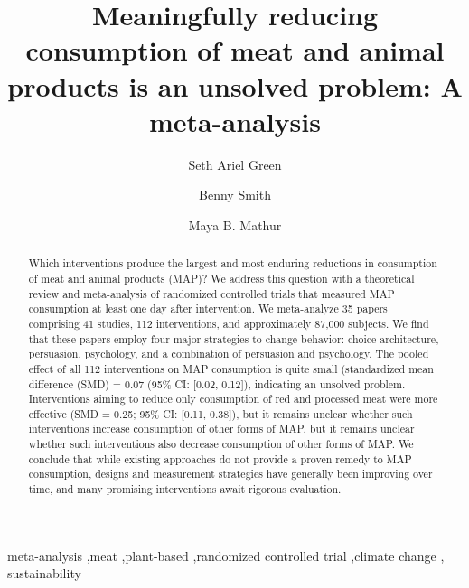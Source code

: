 \documentclass[preprint, 3p,
authoryear]{elsarticle} %
\begin{document}
\begin{frontmatter}

  \title{Meaningfully reducing consumption of meat and animal products
is an unsolved problem: A meta-analysis}
    \author[1]{Seth Ariel Green%
  }
    \author[2]{Benny Smith%
  }
    \author[1]{Maya B. Mathur%
  }
  
  \begin{abstract}
  Which interventions produce the largest and most enduring reductions
  in consumption of meat and animal products (MAP)? We address this
  question with a theoretical review and meta-analysis of randomized
  controlled trials that measured MAP consumption at least one day after
  intervention. We meta-analyze 35 papers comprising 41 studies, 112
  interventions, and approximately 87,000 subjects. We find that these
  papers employ four major strategies to change behavior: choice
  architecture, persuasion, psychology, and a combination of persuasion
  and psychology. The pooled effect of all 112 interventions on MAP
  consumption is quite small (standardized mean difference (SMD) = 0.07
  (95\% CI: {[}0.02, 0.12{]}), indicating an unsolved problem.
  Interventions aiming to reduce only consumption of red and processed
  meat were more effective (SMD = 0.25; 95\% CI: {[}0.11, 0.38{]}), but
  it remains unclear whether such interventions increase consumption of
  other forms of MAP. but it remains unclear whether such interventions
  also decrease consumption of other forms of MAP. We conclude that
  while existing approaches do not provide a proven remedy to MAP
  consumption, designs and measurement strategies have generally been
  improving over time, and many promising interventions await rigorous
  evaluation.
  \end{abstract}
    \begin{keyword}
    meta-analysis \sep meat \sep plant-based \sep randomized controlled
trial \sep climate change \sep 
    sustainability
  \end{keyword}
  
 \end{frontmatter}
\end{document}
